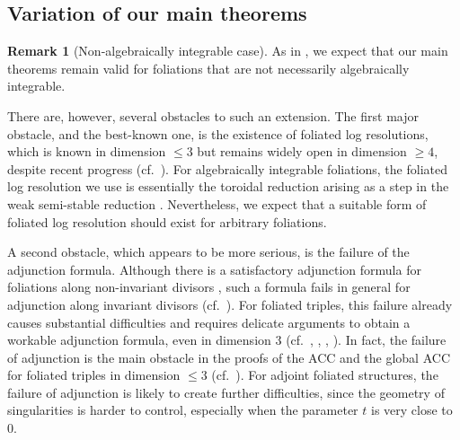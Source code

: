 \documentclass[11pt,reqno]{amsart}
\numberwithin{equation}{section}
\theoremstyle{definition}
\newtheorem{rem}[thm]{Remark}
\begin{document}
\subsection{Variation of our main theorems}\label{subsec: variation}

\begin{rem}[Non-algebraically integrable case]
As in \cite{Cas+25a}, we expect that our main theorems remain valid for foliations that are not necessarily algebraically integrable. 

There are, however, several obstacles to such an extension. The first major obstacle, and the best-known one, is the existence of foliated log resolutions, which is known in dimension $\leq 3$ \cite{Sei68,Can04,MP13} but remains widely open in dimension $\geq 4$, despite recent progress (cf.~\cite{AdSTW25}). For algebraically integrable foliations, the foliated log resolution we use is essentially the toroidal reduction \cite[Proposition~4.4]{AK00} arising as a step in the weak semi-stable reduction \cite[Theorem~2.1]{AK00}. Nevertheless, we expect that a suitable form of foliated log resolution should exist for arbitrary foliations.

A second obstacle, which appears to be more serious, is the failure of the adjunction formula. Although there is a satisfactory adjunction formula for foliations along non-invariant divisors \cite[Theorem~1.1]{CS25a}, such a formula fails in general for adjunction along invariant divisors (cf.~\cite[Example~3.20]{CS25a}). For foliated triples, this failure already causes substantial difficulties and requires delicate arguments to obtain a workable adjunction formula, even in dimension $3$ (cf.~\cite[Sections~3 and~4]{Spi20}, \cite[Section~3]{CS21}, \cite[Section~3]{SS22}, \cite[Section~4]{CS25b}). In fact, the failure of adjunction is the main obstacle in the proofs of the ACC and the global ACC for foliated triples in dimension $\leq 3$ (cf.~\cite{Che22,LLM23,LMX24a,LMX24b}). For adjoint foliated structures, the failure of adjunction is likely to create further difficulties, since the geometry of singularities is harder to control, especially when the parameter $t$ is very close to $0$.
\end{rem}
\end{document}
